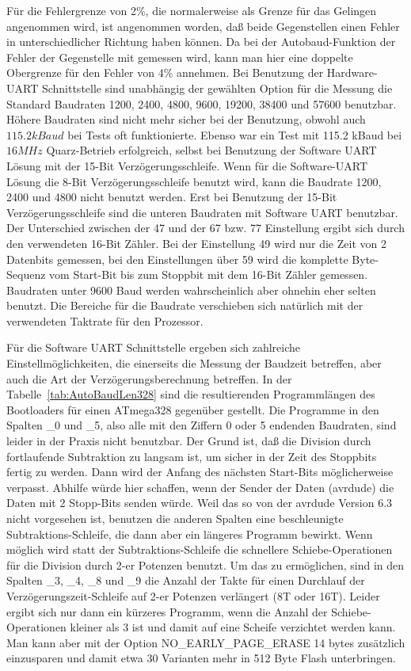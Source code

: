 Für die Fehlergrenze von 2\%, die normalerweise als Grenze für das Gelingen
angenommen wird, ist angenommen worden, daß beide Gegenstellen einen Fehler
in unterschiedlicher Richtung haben können. Da bei der Autobaud-Funktion
der Fehler der Gegenstelle mit gemessen wird, kann man hier eine doppelte
Obergrenze für den Fehler von 4\% annehmen.
Bei Benutzung der Hardware-UART Schnittstelle sind unabhängig der gewählten
Option für die Messung die Standard Baudraten 1200, 2400, 4800, 9600, 19200,
38400 und 57600 benutzbar.
Höhere Baudraten sind nicht mehr sicher bei der Benutzung, obwohl
auch \(115.2kBaud\) bei Tests oft funktionierte.
Ebenso war ein Test mit 115.2 kBaud bei \(16 MHz\) Quarz-Betrieb erfolgreich,
selbst bei Benutzung der Software UART Lösung mit der 15-Bit Verzögerungsschleife.
Wenn für die Software-UART Lösung die 8-Bit Verzögerungsschleife benutzt wird,
kann die Baudrate 1200, 2400 und 4800 nicht benutzt werden.
Erst bei Benutzung der 15-Bit Verzögerungsschleife sind die unteren Baudraten
mit Software UART benutzbar.
Der Unterschied zwischen der 47 und der 67 bzw. 77 Einstellung ergibt
sich durch den verwendeten 16-Bit Zähler. Bei der Einstellung 49 wird nur
die Zeit von 2 Datenbits gemessen, bei den Einstellungen über 59 wird
die komplette Byte-Sequenz vom Start-Bit bis zum Stoppbit mit dem 16-Bit Zähler gemessen.
Baudraten unter 9600 Baud werden wahrscheinlich aber ohnehin eher selten benutzt.
Die Bereiche für die Baudrate verschieben sich natürlich mit der verwendeten
Taktrate für den Prozessor.

Für die Software UART Schnittstelle ergeben sich zahlreiche Einstellmöglichkeiten,
die einerseits die Messung der Baudzeit betreffen, aber auch die Art der
Verzögerungsberechnung betreffen.
In der Tabelle~\ref{tab:AutoBaudLen328} sind die resultierenden Programmlängen des Bootloaders für
einen  ATmega328 gegenüber gestellt. Die Programme in den Spalten \_0 und \_5, also alle 
mit den Ziffern 0 oder 5 endenden Baudraten, sind leider in der Praxis nicht benutzbar.
Der Grund ist, daß die Division durch fortlaufende Subtraktion zu langsam ist, um sicher
in der Zeit des Stoppbits fertig zu werden. Dann wird der Anfang des nächsten Start-Bits
möglicherweise verpasst. Abhilfe würde hier schaffen, wenn der Sender der Daten (avrdude)
die Daten mit 2 Stopp-Bits senden würde.
Weil das so von der avrdude Version 6.3 nicht vorgesehen ist,
benutzen die anderen Spalten eine beschleunigte Subtraktions-Schleife,
die dann aber ein längeres Programm bewirkt.
Wenn möglich wird statt der Subtraktions-Schleife die schnellere Schiebe-Operationen
für die Division durch 2-er Potenzen benutzt. Um das zu ermöglichen, sind in den Spalten
\_3, \_4, \_8 und \_9 die Anzahl der Takte für einen Durchlauf der Verzögerungszeit-Schleife
auf 2-er Potenzen verlängert (8T oder 16T). Leider ergibt sich nur dann ein kürzeres Programm,
wenn die Anzahl der Schiebe-Operationen kleiner als 3 ist und damit auf eine Scheife verzichtet
werden kann. Man kann aber mit der Option NO\_EARLY\_PAGE\_ERASE 14 bytes zusätzlich einzusparen
und damit etwa 30 Varianten mehr in 512 Byte Flash unterbringen.

